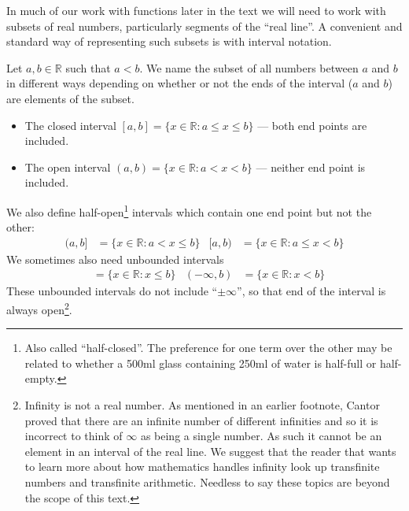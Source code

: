 In much of our work with functions later in the text we will need to work with
subsets of real numbers, particularly segments of the ``real line''. A
convenient and standard way of representing such subsets is with interval
notation.
\begin{defn} \label{def intervals}
  Let $a, b \in \mathbb{R}$ such that $a<b$. We name the subset of all
numbers between $a$ and $b$ in different ways depending on whether or not the
ends of the interval ($a$ and $b$) are elements of the subset.
  \begin{itemize}
   \item The closed interval $[a,b] = \{x \in \mathbb{R} : a \leq x \leq b\}$
--- both end points are included.
   \item The open interval $(a,b) = \{x \in \mathbb{R} : a < x < b\}$ ---
neither end point is included.
  \end{itemize}

  We also define half-open\protect\footnote{Also called ``half-closed''. The
preference
for one term over the other may be related to whether a 500ml glass containing
250ml of water is half-full or half-empty.} intervals which contain one
end point but not the other:
  \begin{align*}
  (a,b] &= \{ x \in \mathbb{R} : a < x \leq b\}
  & [a,b) &= \{ x \in \mathbb{R} : a \leq x < b\}
  \end{align*}
  We sometimes also need unbounded intervals
  \begin{align*}
  [a, \infty) &= \{ x \in \mathbb{R} : a \leq x \}
  & (a, \infty) &= \{ x \in \mathbb{R} : a < x \} \\
  (-\infty, b] &= \{ x \in \mathbb{R} : x \leq b \}
  & (-\infty, b) &= \{ x \in \mathbb{R} : x < b \}
  \end{align*}
  These unbounded intervals do not include ``$\pm\infty$'', so that end of the
interval is always open\footnote{Infinity is
not a real number. As mentioned in an earlier footnote, Cantor proved that
there are an infinite number of different infinities and so it is incorrect
to think of $\infty$ as being a single number. As such it cannot be an element
in an interval of the real line. We suggest that the reader that wants to learn
more about how mathematics handles infinity look up transfinite numbers and
transfinite arithmetic. Needless to say these topics are beyond the scope of
this text.}.
\end{defn}


